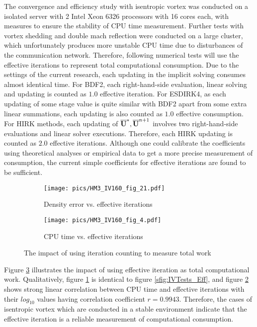 \documentclass[preprint,12pt]{elsarticle}
\begin{document}
The convergence and efficiency study with isentropic vortex was
conducted on a isolated server with 2 Intel Xeon 6326 processors with
16 cores each, with measures to ensure the stability of CPU time measurement.
Further tests with vortex shedding and double mach reflection
were conducted on a large cluster, which unfortunately produces more
unstable CPU time due to disturbances of the communication network.
Therefore, following numerical tests will use the effective iterations
to represent total computational consumption.
Due to the settings of the current research, each updating in
the implicit solving consumes almost identical time.
For BDF2, each right-hand-side evaluation, linear solving and updating
is counted as $1.0$ effective iteration.
For ESDIRK4, as each updating of some stage value is quite similar with
BDF2 apart from some extra linear summations, each updating is also
counted as $1.0$ effective consumption.
For HIRK methods, each updating of $\overline{\mathbf{U}}^*,\overline{\mathbf{U}}^{n+1}$
involves two right-hand-side evaluations and linear solver executions.
Therefore, each HIRK updating is counted as $2.0$ effective iterations.
Although one could calibrate the coefficients using theoretical analyses or
empirical data to get a more precise measurement of consumption,
the current simple coefficients for effective iterations are found to
be sufficient.

\begin{figure}[htbp]
    \centering
    \begin{subfigure}{0.5\textwidth}
        \texttt{[image: pics/HM3\_IV160\_fig\_21.pdf]}
        \caption[]{Density error vs. effective iterations }
        \label{sfig:IVTests2_EffIt}
    \end{subfigure}\hfill
    \begin{subfigure}{0.5\textwidth}
        \texttt{[image: pics/HM3\_IV160\_fig\_4.pdf]}
        \caption[]{CPU time vs. effective iterations}
        \label{sfig:IVTests2_CPUVEffIt}
    \end{subfigure}
    \caption[]{The impact of using iteration counting to measure total work}
    \label{fig:IVTests2}
\end{figure}

Figure \ref{fig:IVTests2} illustrates the impact of using effective iteration
as total computational work. Qualitatively, figure \ref{sfig:IVTests2_EffIt}
is identical to figure \ref{sfig:IVTests_Eff},
and figure  \ref{sfig:IVTests2_CPUVEffIt} shows strong linear correlation
between CPU time and effective iterations with their
$log_{10}$ values having correlation coefficient $r=0.9943$.
Therefore, the cases of isentropic vortex which are conducted in
a stable environment indicate that the effective iteration is
a reliable measurement of computational consumption.
\end{document}
